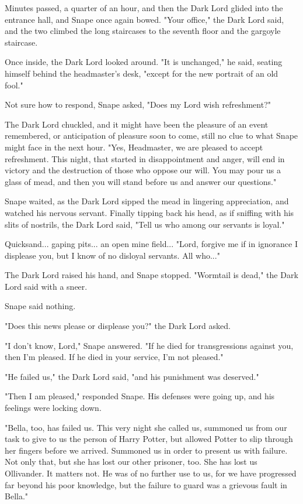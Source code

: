 Minutes passed, a quarter of an hour, and then the Dark Lord glided into the entrance hall, and Snape once again bowed. "Your office," the Dark Lord said, and the two climbed the long staircases to the seventh floor and the gargoyle staircase.

Once inside, the Dark Lord looked around. "It is unchanged," he said, seating himself behind the headmaster's desk, "except for the new portrait of an old fool."

Not sure how to respond, Snape asked, "Does my Lord wish refreshment?"

The Dark Lord chuckled, and it might have been the pleasure of an event remembered, or anticipation of pleasure soon to come, still no clue to what Snape might face in the next hour. "Yes, Headmaster, we are pleased to accept refreshment. This night, that started in disappointment and anger, will end in victory and the destruction of those who oppose our will. You may pour us a glass of mead, and then you will stand before us and answer our questions."

Snape waited, as the Dark Lord sipped the mead in lingering appreciation, and watched his nervous servant. Finally tipping back his head, as if sniffing with his slits of nostrils, the Dark Lord said, "Tell us who among our servants is loyal."

Quicksand... gaping pits... an open mine field... "Lord, forgive me if in ignorance I displease you, but I know of no disloyal servants. All who..."

The Dark Lord raised his hand, and Snape stopped. "Wormtail is dead," the Dark Lord said with a sneer.

Snape said nothing.

"Does this news please or displease you?" the Dark Lord asked.

"I don't know, Lord," Snape answered. "If he died for transgressions against you, then I'm pleased. If he died in your service, I'm not pleased."

"He failed us," the Dark Lord said, "and his punishment was deserved."

"Then I am pleased," responded Snape. His defenses were going up, and his feelings were locking down.

"Bella, too, has failed us. This very night she called us, summoned us from our task to give to us the person of Harry Potter, but allowed Potter to slip through her fingers before we arrived. Summoned us in order to present us with failure. Not only that, but she has lost our other prisoner, too. She has lost us Ollivander. It matters not. He was of no further use to us, for we have progressed far beyond his poor knowledge, but the failure to guard was a grievous fault in Bella."

